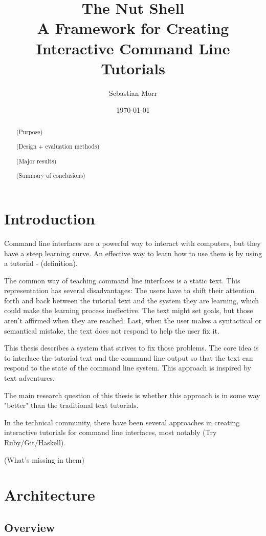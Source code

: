 \documentclass[twoside]{scrreprt}
\title{The Nut Shell \\ A Framework for Creating Interactive Command Line Tutorials}
\author{Sebastian Morr}
\date{\today}
\begin{document}
\maketitle

\tableofcontents

\begin{abstract}
        (Purpose)

        (Design + evaluation methods)

        (Major results)

        (Summary of conclusions)
\end{abstract}

\chapter{Introduction}

Command line interfaces are a powerful way to interact with computers, but they have a steep learning curve. An effective way to learn how to use them is by using a tutorial - (definition).

The common way of teaching command line interfaces is a static text. This representation has several disadvantages: The users have to shift their attention forth and back between the tutorial text and the system they are learning, which could make the learning process ineffective. The text might set goals, but those aren't affirmed when they are reached. Last, when the user makes a syntactical or semantical mistake, the text does not respond to help the user fix it.

This thesis describes a system that strives to fix those problems. The core idea is to interlace the tutorial text and the command line output so that the text can respond to the state of the command line system. This approach is inspired by text adventures.

The main research question of this thesis is whether this approach is in some way "better" than the traditional text tutorials.

In the technical community, there have been several approaches in creating interactive tutorials for command line interfaces, most notably (Try Ruby/Git/Haskell).

    (What's missing in them)

\chapter{Architecture}

\section{Overview}
\end{document}
